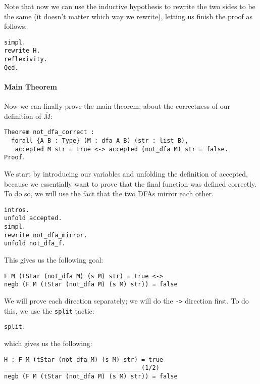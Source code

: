 Note that now we can use the inductive hypothesis to rewrite the two sides to be the same (it doesn't matter which way we rewrite), letting us finish the proof as follows:

\begin{verbatim}
simpl.
rewrite H.
reflexivity.
Qed.
\end{verbatim}

\paragraph{Main Theorem}

Now we can finally prove the main theorem, about the correctness of our definition of $\overline{M}$:

\begin{verbatim}
Theorem not_dfa_correct :
  forall {A B : Type} (M : dfa A B) (str : list B),
   accepted M str = true <-> accepted (not_dfa M) str = false.
Proof.
\end{verbatim}

We start by introducing our variables and unfolding the definition of accepted, because we essentially want to prove that the final function was defined correctly.
To do so, we will use the fact that the two DFAs mirror each other.

\begin{verbatim}
intros.
unfold accepted.
simpl.
rewrite not_dfa_mirror.
unfold not_dfa_f.
\end{verbatim}

This gives us the following goal:

\begin{verbatim}
F M (tStar (not_dfa M) (s M) str) = true <->
negb (F M (tStar (not_dfa M) (s M) str)) = false
\end{verbatim}

We will prove each direction separately; we will do the \texttt{->} direction first.
To do this, we use the \texttt{split} tactic:

\begin{verbatim}
split.
\end{verbatim}

which gives us the following:

\begin{verbatim}
H : F M (tStar (not_dfa M) (s M) str) = true
______________________________________(1/2)
negb (F M (tStar (not_dfa M) (s M) str)) = false
\end{verbatim}

